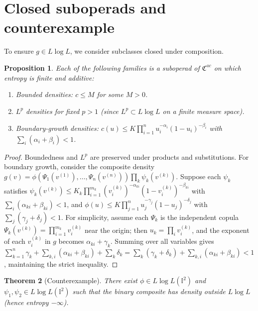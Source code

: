\documentclass[11pt]{amsart}
\newtheorem{theorem}{Theorem}[section]
\newtheorem{proposition}[theorem]{Proposition}
\newcommand{\I}{\mathbb I}
\begin{document}
\begin{sloppypar}
\section{Closed suboperads and counterexample}
\label{sec:closed}
To ensure $g\in L\log L$, we consider subclasses closed under composition.

\begin{proposition}
\label{prop:closed}
Each of the following families is a suboperad of $\mathfrak{C}^{ac}$ on which entropy is finite and additive:
\begin{enumerate}
\item[(1)] Bounded densities: $c\leq M$ for some $M>0$.
\item[(2)] $L^{p}$ densities for fixed $p>1$ (since $L^{p}\subset L\log L$ on a finite measure space).
\item[(3)] Boundary-growth densities: $c(u)\leq K\prod_{i=1}^{n}u_{i}^{-\alpha_{i}}(1-u_{i})^{-\beta_{i}}$ with $\displaystyle \sum_{i}(\alpha_{i}+\beta_{i})<1$.
\end{enumerate}
\end{proposition}

\begin{proof}
Boundedness and $L^{p}$ are preserved under products and substitutions. For boundary growth, consider the composite density $g(v)=\phi(\Psi_{1}(v^{(1)}),\dots,\Psi_{n}(v^{(n)}))\prod_{k}\psi_{k}(v^{(k)})$. Suppose each $\psi_{k}$ satisfies $\psi_{k}(v^{(k)})\leq K_{k}\prod_{i=1}^{m_{k}}(v_{i}^{(k)})^{-\alpha_{ki}}(1-v_{i}^{(k)})^{-\beta_{ki}}$ with $\displaystyle \sum_{i}(\alpha_{ki}+\beta_{ki})<1$, and $\phi(u)\leq K\prod_{j=1}^{n}u_{j}^{-\gamma_{j}}(1-u_{j})^{-\delta_{j}}$ with $\displaystyle \sum_{j}(\gamma_{j}+\delta_{j})<1$. For simplicity, assume each $\Psi_{k}$ is the independent copula $\Psi_{k}(v^{(k)})=\prod_{i=1}^{m_{k}}v_{i}^{(k)}$ near the origin; then $u_{k}=\prod_{i}v_{i}^{(k)}$, and the exponent of each $v_{i}^{(k)}$ in $g$ becomes $\alpha_{ki}+\gamma_{k}$. Summing over all variables gives $\displaystyle \sum_{k=1}^{n}\gamma_{k}+\sum_{k,i}(\alpha_{ki}+\beta_{ki})+\sum_{k}\delta_{k}=\sum_{k}(\gamma_{k}+\delta_{k})+\sum_{k,i}(\alpha_{ki}+\beta_{ki})<1$, maintaining the strict inequality.
\end{proof}

\begin{theorem}[Counterexample]
\label{thm:counterex}
There exist $\phi\in L\log L(\I^{2})$ and $\psi_{1},\psi_{2}\in L\log L(\I^{2})$ such that the binary composite has density outside $L\log L$ (hence entropy $-\infty$).
\end{theorem}


\end{sloppypar}
\end{document}
